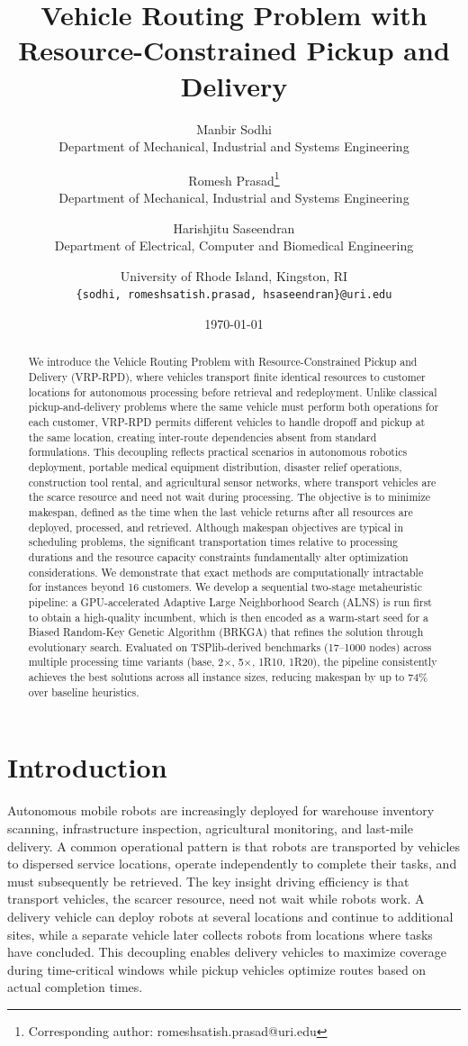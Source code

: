 \documentclass{article}
\title{Vehicle Routing Problem with Resource-Constrained Pickup and Delivery}
\author{
    \textnormal{Manbir Sodhi} \\
    Department of Mechanical, Industrial and Systems Engineering \\
    \and
    \textnormal{Romesh Prasad}\thanks{Corresponding author: romeshsatish.prasad@uri.edu} \\
    Department of Mechanical, Industrial and Systems Engineering \\
    \and
    \textnormal{Harishjitu Saseendran}\\
    Department of Electrical, Computer and Biomedical Engineering \\
    \and
    University of Rhode Island, Kingston, RI \\
    \texttt{\{sodhi, romeshsatish.prasad, hsaseendran\}@uri.edu}
}
\date{\today}
\newcommand{\tx}{\ensuremath{\times}}
\begin{document}
\maketitle

\begin{abstract}
We introduce the Vehicle Routing Problem with Resource-Constrained Pickup and Delivery (VRP-RPD), where vehicles transport finite identical resources to customer locations for autonomous processing before retrieval and redeployment. Unlike classical pickup-and-delivery problems where the same vehicle must perform both operations for each customer, VRP-RPD permits different vehicles to handle dropoff and pickup at the same location, creating inter-route dependencies absent from standard formulations. This decoupling reflects practical scenarios in autonomous robotics deployment, portable medical equipment distribution, disaster relief operations, construction tool rental, and agricultural sensor networks, where transport vehicles are the scarce resource and need not wait during processing. The objective is to minimize makespan, defined as the time when the last vehicle returns after all resources are deployed, processed, and retrieved. Although makespan objectives are typical in scheduling problems, the significant transportation times relative to processing durations and the resource capacity constraints fundamentally alter optimization considerations. We demonstrate that exact methods are computationally intractable for instances beyond 16 customers. We develop a sequential two-stage metaheuristic pipeline: a GPU-accelerated Adaptive Large Neighborhood Search (ALNS) is run first to obtain a high-quality incumbent, which is then encoded as a warm-start seed for a Biased Random-Key Genetic Algorithm (BRKGA) that refines the solution through evolutionary search. Evaluated on TSPlib-derived benchmarks (17--1000 nodes) across multiple processing time variants (base, 2\tx, 5\tx, 1R10, 1R20), the pipeline consistently achieves the best solutions across all instance sizes, reducing makespan by up to 74\% over baseline heuristics.
\end{abstract}

\section{Introduction}

Autonomous mobile robots are increasingly deployed for warehouse inventory scanning, infrastructure inspection, agricultural monitoring, and last-mile delivery. A common operational pattern is that robots are transported by vehicles to dispersed service locations, operate independently to complete their tasks, and must subsequently be retrieved. The key insight driving efficiency is that transport vehicles, the scarcer resource, need not wait while robots work. A delivery vehicle can deploy robots at several locations and continue to additional sites, while a separate vehicle later collects robots from locations where tasks have concluded. This decoupling enables delivery vehicles to maximize coverage during time-critical windows while pickup vehicles optimize routes based on actual completion times.
\end{document}
